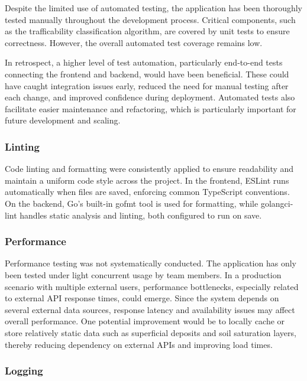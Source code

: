 Despite the limited use of automated testing, the application has been thoroughly tested manually throughout the development process. Critical components, such as the trafficability classification algorithm, are covered by unit tests to ensure correctness. However, the overall automated test coverage remains low.

In retrospect, a higher level of test automation, particularly end-to-end tests connecting the frontend and backend, would have been beneficial. These could have caught integration issues early, reduced the need for manual testing after each change, and improved confidence during deployment. Automated tests also facilitate easier maintenance and refactoring, which is particularly important for future development and scaling.

\subsubsection*{Linting}

Code linting and formatting were consistently applied to ensure readability and maintain a uniform code style across the project. In the frontend, ESLint runs automatically when files are saved, enforcing common TypeScript conventions. On the backend, Go's built-in gofmt tool is used for formatting, while golangci-lint handles static analysis and linting, both configured to run on save.

\subsubsection*{Performance}

Performance testing was not systematically conducted. The application has only been tested under light concurrent usage by team members. In a production scenario with multiple external users, performance bottlenecks, especially related to external API response times, could emerge. Since the system depends on several external data sources, response latency and availability issues may affect overall performance. One potential improvement would be to locally cache or store relatively static data such as superficial deposits and soil saturation layers, thereby reducing dependency on external APIs and improving load times.

\subsubsection*{Logging}

